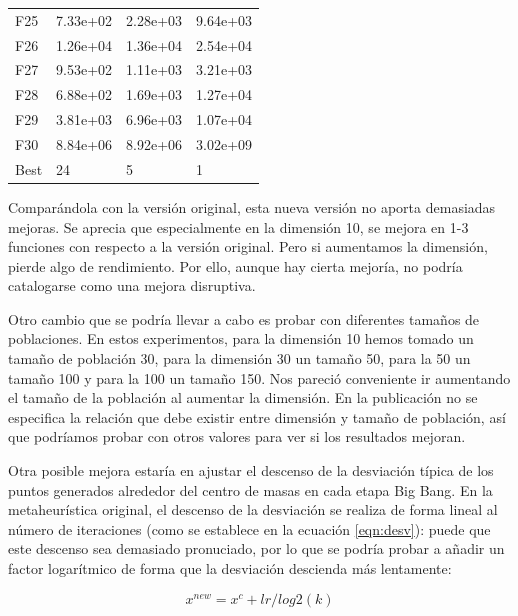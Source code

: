 \begin{table}[H]
\begin{minipage}{.5\linewidth}
\begin{tabular}{llll}
        F25  &  7.33e+02 &   2.28e+03 &  9.64e+03 \\
        F26  &  1.26e+04 &   1.36e+04 &  2.54e+04 \\
        F27  &  9.53e+02 &   1.11e+03 &  3.21e+03 \\
        F28  &  6.88e+02 &   1.69e+03 &  1.27e+04 \\
        F29  &  3.81e+03 &   6.96e+03 &  1.07e+04 \\
        F30  &  8.84e+06 &   8.92e+06 &  3.02e+09 \\
        Best &        24 &          5 &         1 \\
        \bottomrule
        \end{tabular}
        
    \end{minipage} 
\end{table}

\newpage
Comparándola con la versión original, esta nueva versión no aporta demasiadas mejoras. Se aprecia que especialmente en la dimensión 10, se mejora en 1-3 funciones con respecto a la versión original. Pero si aumentamos la dimensión, pierde algo de rendimiento. Por ello, aunque hay cierta mejoría, no podría catalogarse como una mejora disruptiva.

Otro cambio que se podría llevar a cabo es probar con diferentes tamaños de poblaciones. En estos experimentos, para la dimensión 10 hemos tomado un tamaño de población 30, para la dimensión 30 un tamaño 50, para la 50 un tamaño 100 y para la 100 un tamaño 150. Nos pareció conveniente ir aumentando el tamaño de la población al aumentar la dimensión. En la publicación no se especifica la relación que debe existir entre dimensión y tamaño de población, así que podríamos probar con otros valores para ver si los resultados mejoran. 

Otra posible mejora estaría en ajustar el descenso de la desviación típica de los puntos generados alrededor del centro de masas en cada etapa Big Bang. En la metaheurística original, el descenso de la desviación se realiza de forma lineal al número de iteraciones (como se establece en la ecuación \ref{eqn:desv}): puede que este descenso sea demasiado pronuciado, por lo que se podría probar a añadir un factor logarítmico de forma que la desviación descienda más lentamente:

\begin{equation}
    x^{new} = x^c + lr/log2(k)
\end{equation}

